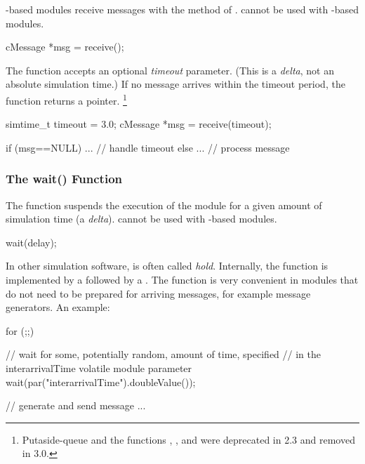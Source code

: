 -based modules receive messages with the 
method of .  cannot be used with
-based modules.

\begin{cpp}
cMessage *msg = receive();
\end{cpp}

The  function accepts an optional \textit{timeout}
parameter. (This is a \textit{delta}, not an
absolute simulation time.) If no message arrives within the timeout
period, the function returns a  pointer.
    \footnote{Putaside-queue and the functions ,
    , and  were deprecated
    in {\opp} 2.3 and removed in {\opp} 3.0.}

\begin{cpp}
simtime_t timeout = 3.0;
cMessage *msg = receive(timeout);

if (msg==NULL)
{
    ...   // handle timeout
}
else
{
    ...  // process message
}
\end{cpp}

\subsubsection{The wait() Function}
\label{sec:simple-modules:wait}

The  function suspends the execution of the module for a
given amount of simulation time (a \textit{delta}).  cannot
be used with -based modules.

\begin{cpp}
wait(delay);
\end{cpp}

In other simulation software,  is often called \textit{hold}.
Internally, the  function is implemented by a
 followed by a .
The  function is very convenient in modules that do not need
to be prepared for arriving messages, for example message generators.
An example:

\begin{cpp}
for (;;)
{
    // wait for some, potentially random, amount of time, specified
    // in the interarrivalTime volatile module parameter
    wait(par("interarrivalTime").doubleValue());

    // generate and send message
    ...
}
\end{cpp}

